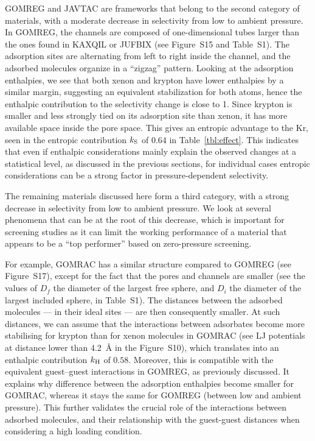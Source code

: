 \documentclass[main]{subfiles}
\begin{document}
  GOMREG and JAVTAC are frameworks that belong to the second category of materials, with a moderate decrease in selectivity from low to ambient pressure. In GOMREG, the channels are composed of one-dimensional tubes larger than the ones found in KAXQIL or JUFBIX (see Figure~S15 and Table~S1). The adsorption sites are alternating from left to right inside the channel, and the adsorbed molecules organize in a ``zigzag'' pattern. Looking at the adsorption enthalpies, we see that both xenon and krypton have lower enthalpies by a similar margin, suggesting an equivalent stabilization for both atoms, hence the enthalpic contribution to the selectivity change is close to 1.
  Since krypton is smaller and less strongly tied on its adsorption site than xenon, it has more available space inside the pore space. This gives an entropic advantage to the Kr, seen in the entropic contribution $k_{\text{S}}$ of $0.64$ in Table~\ref{tbl:effect}. This indicates that even if enthalpic considerations mainly explain the observed changes at a statistical level, as discussed in the previous sections, for individual cases entropic considerations can be a strong factor in pressure-dependent selectivity.
  
  The remaining materials discussed here form a third category, with a strong decrease in selectivity from low to ambient pressure. We look at several phenomena that can be at the root of this decrease, which is important for screening studies as it can limit the working performance of a material that appears to be a ``top performer'' based on zero-pressure screening.
  
  
  For example, GOMRAC has a similar structure compared to GOMREG (see Figure~S17), except for the fact that the pores and channels are smaller (see the values of $D_f$ the diameter of the largest free sphere, and $D_i$ the diameter of the largest included sphere, in Table~S1). The distances between the adsorbed molecules --- in their ideal sites --- are then consequently smaller. At such distances, we can assume that the interactions between adsorbates become more stabilising for krypton than for xenon molecules in GOMRAC (see LJ potentials at distance lower than \SI{4.2}{\angstrom} in the Figure~S10), which translates into an enthalpic contribution $k_{\text{H}}$ of $0.58$. Moreover, this is compatible with the equivalent guest--guest interactions in GOMREG, as previously discussed. It explains why difference between the adsorption enthalpies become smaller for GOMRAC, whereas it stays the same for GOMREG (between low and ambient pressure). This further validates the crucial role of the interactions between adsorbed molecules, and their relationship with the guest-guest distances when considering a high loading condition.
  
\end{document}
